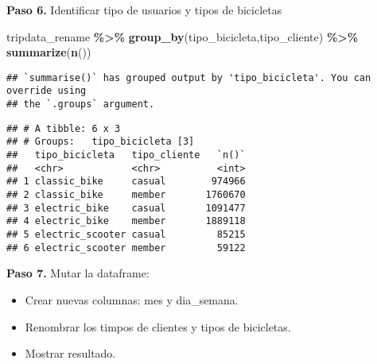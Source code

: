 \documentclass[
]{article}
\newenvironment{Shaded}{\begin{snugshade}}{\end{snugshade}}
\newcommand{\FunctionTok}[1]{\textcolor[rgb]{0.13,0.29,0.53}{\textbf{#1}}}
\newcommand{\NormalTok}[1]{#1}
\newcommand{\SpecialCharTok}[1]{\textcolor[rgb]{0.81,0.36,0.00}{\textbf{#1}}}
\begin{document}
\hfill\break
\textbf{Paso 6.} Identificar tipo de usuarios y tipos de bicicletas

\begin{Shaded}
\begin{Highlighting}[]
\NormalTok{tripdata\_rename }\SpecialCharTok{\%\textgreater{}\%} 
  \FunctionTok{group\_by}\NormalTok{(tipo\_bicicleta,tipo\_cliente) }\SpecialCharTok{\%\textgreater{}\%}
  \FunctionTok{summarize}\NormalTok{(}\FunctionTok{n}\NormalTok{())}
\end{Highlighting}
\end{Shaded}

\begin{verbatim}
## `summarise()` has grouped output by 'tipo_bicicleta'. You can override using
## the `.groups` argument.
\end{verbatim}

\begin{verbatim}
## # A tibble: 6 x 3
## # Groups:   tipo_bicicleta [3]
##   tipo_bicicleta   tipo_cliente   `n()`
##   <chr>            <chr>          <int>
## 1 classic_bike     casual        974966
## 2 classic_bike     member       1760670
## 3 electric_bike    casual       1091477
## 4 electric_bike    member       1889118
## 5 electric_scooter casual         85215
## 6 electric_scooter member         59122
\end{verbatim}

\hfill\break
\textbf{Paso 7.} Mutar la dataframe:

\begin{itemize}
\item
  Crear nuevas columnas: mes y dia\_semana.
\item
  Renombrar los timpos de clientes y tipos de bicicletas.
\item
  Mostrar resultado.
\end{itemize}
\end{document}
